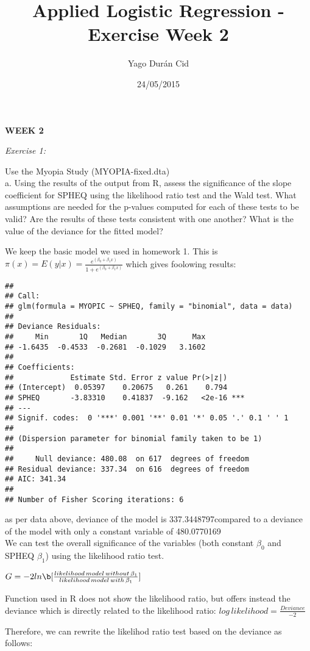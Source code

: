 \documentclass[]{article}
\title{Applied Logistic Regression - Exercise Week 2}
\author{Yago Durán Cid}
\date{24/05/2015}
\begin{document}
\maketitle


\textbf{WEEK 2}

\emph{Exercise 1:}

Use the Myopia Study (MYOPIA-fixed.dta)\\a. Using the results of the
output from R, assess the significance of the slope coefficient for
SPHEQ using the likelihood ratio test and the Wald test. What
assumptions are needed for the p-values computed for each of these tests
to be valid? Are the results of these tests consistent with one another?
What is the value of the deviance for the fitted model?

We keep the basic model we used in homework 1. This is
$\pi(x)=E(y|x)=\frac{e^{(\beta_0+\beta_1x)}}{1+e^{(\beta_0+\beta_1x)}}$
which gives foolowing results:

\begin{verbatim}
## 
## Call:
## glm(formula = MYOPIC ~ SPHEQ, family = "binomial", data = data)
## 
## Deviance Residuals: 
##     Min       1Q   Median       3Q      Max  
## -1.6435  -0.4533  -0.2681  -0.1029   3.1602  
## 
## Coefficients:
##             Estimate Std. Error z value Pr(>|z|)    
## (Intercept)  0.05397    0.20675   0.261    0.794    
## SPHEQ       -3.83310    0.41837  -9.162   <2e-16 ***
## ---
## Signif. codes:  0 '***' 0.001 '**' 0.01 '*' 0.05 '.' 0.1 ' ' 1
## 
## (Dispersion parameter for binomial family taken to be 1)
## 
##     Null deviance: 480.08  on 617  degrees of freedom
## Residual deviance: 337.34  on 616  degrees of freedom
## AIC: 341.34
## 
## Number of Fisher Scoring iterations: 6
\end{verbatim}

as per data above, deviance of the model is 337.3448797compared to a
deviance of the model with only a constant variable of 480.0770169\\We
can test the overall significance of the variables (both constant
$\beta_0$ and SPHEQ $\beta_1$) using the likelihood ratio test.

$G=-2ln\b[\frac{likelihood\,model\,without\,\beta_1}{likelihood\,model\,with\,\beta_1}]$

Function used in R does not show the likelihood ratio, but offers
instead the deviance which is directly related to the likelihood ratio:
$log\,likelihood=\frac{Deviance}{-2}$

Therefore, we can rewrite the likelihod ratio test based on the deviance
as follows:
\end{document}
